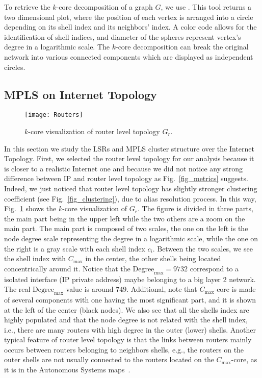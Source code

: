 To retrieve the $k$-core decomposition of a graph $G$, we use
\lanet\cite{Alvarez06k}. This tool returns a two dimensional plot, where the
position of each vertex is arranged into a circle depending on its shell index
and its neighbors' index. A color code allows for the identification of shell
indices, and diameter of the spheres represent vertex's degree in a logarithmic
scale. The $k$-core decomposition can break the original network into various
connected components which are displayed as independent circles.

\subsection{MPLS on Internet Topology}\label{cluster.topo}
\begin{figure}[!t]
  \begin{center}
    \texttt{[image: Routers]}
  \end{center}
  \caption{$k$-core visualization of router level topology $G_{r}$.}
  \label{fig_k_core_routers}
\end{figure}

In this section we study the LSRs and MPLS cluster structure over the Internet
Topology.  First, we selected the router level topology for our analysis because
it is closer to a realistic Internet one and because  we did not notice any
strong difference between IP and router level topology as Fig.~\ref{fig_metrics}
suggests. Indeed, we just noticed that router level topology has slightly
stronger clustering coefficient (see Fig.~\ref{fig_clustering}), due to alias
resolution process. In this way, Fig.~\ref{fig_k_core_routers} shows the
$k$-core visualization of $G_{r}$.  The figure is divided in three parts, the
main part being in the upper left while the two others are a zoom on the main
part.  The main part is composed of two scales, the one on the left is the node
degree scale representing the degree in a logarithmic scale, while the one on
the right is a gray scale with each shell index $c_i$. Between the two scales,
we see the shell index with $C_{\max}$ in the center, the other shells being
located concentrically around it. Notice that the $\text{Degree}_{\max}=9732$
correspond to a isolated interface (IP private address) maybe belonging to a big
layer 2 network. The real $\text{Degree}_{\max}$ value is around $749$.
Additional, note that $C_{\max}$-core is made of several components with one
having the most significant part, and it is shown at the left of the center
(black nodes).  We also see that all the shells index are highly populated and
that the node degree is not related with the shell index, i.e., there are many
routers with high degree in the outer (lower) shells.  Another typical feature
of router level topology is that the links between routers mainly occurs between
routers belonging to neighbors shells, e.g., the routers on the outer shells are
not usually connected to the routers located on the  $C_{\max}$-core, as it is
in the Autonomous Systems maps~\cite{Alvarez06k}.


